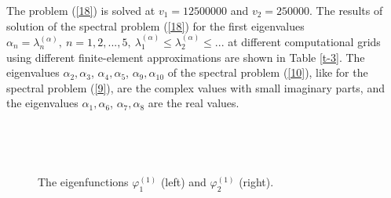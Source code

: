 \documentclass[authoryear]{elsarticle}
\begin{document}
The problem  (\ref{18}) is solved at $v_1 = 12 500 000$ and $v_2 = 250 000$. The results of solution of the spectral problem (\ref{18}) for the first eigenvalues $\alpha_n = \lambda_n^{(\alpha)}, \ n = 1,2, ..., 5, \  \lambda_1^{(\alpha)} \leq  \lambda_2^{(\alpha )} \leq ...$
at different computational grids using different finite-element approximations are shown in Table \ref{t-3}. 
The eigenvalues $\alpha_2, \alpha_3$, $\alpha_4, \alpha_5$, $\alpha_9, \alpha_{10}$ of the spectral problem (\ref{10}), like for the spectral problem (\ref{9}), are the complex values with small imaginary parts, and the eigenvalues $\alpha_1, \alpha_6$, $\alpha_7, \alpha_8$ are the real values.
\begin{figure}[h]
  \begin{center}
\begin{minipage}{0.49\linewidth}
 \\
\end{minipage}
\hfill
\begin{minipage}{0.49\linewidth}
 \\
\end{minipage}
\caption{The eigenfunctions $\varphi^{(1)}_1$ (left) and $\varphi^{(1)}_2$ (right).}
\label{fig:7}
  \end{center}
\end{figure}
\end{document}
